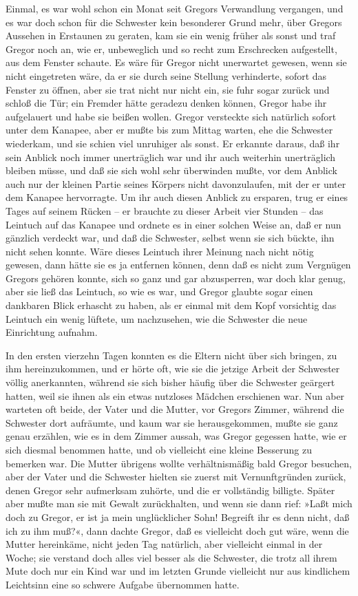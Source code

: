 Einmal, es war wohl schon ein Monat seit Gregors Verwandlung vergangen,
und es war doch schon für die Schwester kein besonderer Grund mehr, über
Gregors Aussehen in Erstaunen zu geraten, kam sie ein wenig früher als
sonst und traf Gregor noch an, wie er, unbeweglich und so recht zum
Erschrecken aufgestellt, aus dem Fenster schaute. Es wäre für Gregor
nicht unerwartet gewesen, wenn sie nicht eingetreten wäre, da er sie
durch seine Stellung verhinderte, sofort das Fenster zu öffnen, aber sie
trat nicht nur nicht ein, sie fuhr sogar zurück und schloß die Tür; ein
Fremder hätte geradezu denken können, Gregor habe ihr aufgelauert und
habe sie beißen wollen. Gregor versteckte sich natürlich sofort unter
dem Kanapee, aber er mußte bis zum Mittag warten, ehe die Schwester
wiederkam, und sie schien viel unruhiger als sonst. Er erkannte daraus,
daß ihr sein Anblick noch immer unerträglich war und ihr auch weiterhin
unerträglich bleiben müsse, und daß sie sich wohl sehr überwinden mußte,
vor dem Anblick auch nur der kleinen Partie seines Körpers nicht
davonzulaufen, mit der er unter dem Kanapee hervorragte. Um ihr auch
diesen Anblick zu ersparen, trug er eines Tages auf seinem Rücken -- er
brauchte zu dieser Arbeit vier Stunden -- das Leintuch auf das Kanapee
und ordnete es in einer solchen Weise an, daß er nun gänzlich verdeckt
war, und daß die Schwester, selbst wenn sie sich bückte, ihn nicht sehen
konnte. Wäre dieses Leintuch ihrer Meinung nach nicht nötig gewesen,
dann hätte sie es ja entfernen können, denn daß es nicht zum Vergnügen
Gregors gehören konnte, sich so ganz und gar abzusperren, war doch klar
genug, aber sie ließ das Leintuch, so wie es war, und Gregor glaubte
sogar einen dankbaren Blick erhascht zu haben, als er einmal mit dem
Kopf vorsichtig das Leintuch ein wenig lüftete, um nachzusehen, wie die
Schwester die neue Einrichtung aufnahm.

In den ersten vierzehn Tagen konnten es die Eltern nicht über sich
bringen, zu ihm hereinzukommen, und er hörte oft, wie sie die jetzige
Arbeit der Schwester völlig anerkannten, während sie sich bisher häufig
über die Schwester geärgert hatten, weil sie ihnen als ein etwas
nutzloses Mädchen erschienen war. Nun aber warteten oft beide, der Vater
und die Mutter, vor Gregors Zimmer, während die Schwester dort
aufräumte, und kaum war sie herausgekommen, mußte sie ganz genau
erzählen, wie es in dem Zimmer aussah, was Gregor gegessen hatte, wie er
sich diesmal benommen hatte, und ob vielleicht eine kleine Besserung zu
bemerken war. Die Mutter übrigens wollte verhältnismäßig bald Gregor
besuchen, aber der Vater und die Schwester hielten sie zuerst mit
Vernunftgründen zurück, denen Gregor sehr aufmerksam zuhörte, und die er
vollständig billigte. Später aber mußte man sie mit Gewalt zurückhalten,
und wenn sie dann rief: »Laßt mich doch zu Gregor, er ist ja mein
unglücklicher Sohn! Begreift ihr es denn nicht, daß ich zu ihm muß?«,
dann dachte Gregor, daß es vielleicht doch gut wäre, wenn die Mutter
hereinkäme, nicht jeden Tag natürlich, aber vielleicht einmal in der
Woche; sie verstand doch alles viel besser als die Schwester, die trotz
all ihrem Mute doch nur ein Kind war und im letzten Grunde vielleicht
nur aus kindlichem Leichtsinn eine so schwere Aufgabe übernommen hatte.

